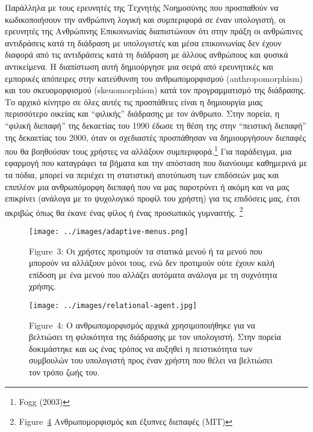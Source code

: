 \documentclass[
]{article}
\begin{document}
Παράλληλα με τους ερευνητές της Τεχνητής Νοημοσύνης που προσπαθούν να
κωδικοποιήσουν την ανθρώπινη λογική και συμπεριφορά σε έναν υπολογιστή,
οι ερευνητές της Ανθρώπινης Επικοινωνίας διαπιστώνουν ότι στην πράξη οι
ανθρώπινες αντιδράσεις κατά τη διάδραση με υπολογιστές και μέσα
επικοινωνίας δεν έχουν διαφορά από τις αντιδράσεις κατά τη διάδραση με
άλλους ανθρώπους και φυσικά αντικείμενα. Η διαπίστωση αυτή δημιούργησε
μια σειρά από ερευνητικές και εμπορικές απόπειρες στην κατεύθυνση του
ανθρωπομορφισμού (anthropomorphism) και του σκευομορφισμού
(skeuomorphism) κατά τον προγραμματισμό της διάδρασης. Το αρχικό κίνητρο
σε όλες αυτές τις προσπάθειες είναι η δημιουργία μιας περισσότερο
οικείας και ``φιλικής'' διάδρασης με τον άνθρωπο. Στην πορεία, η
``φιλική διεπαφή'' της δεκαετίας του 1990 έδωσε τη θέση της στην
``πειστική διεπαφή'' της δεκαετίας του 2000, όταν οι σχεδιαστές
προσπάθησαν να δημιουργήσουν διεπαφές που θα βοηθούσαν τους χρήστες να
αλλάξουν συμπεριφορά.\footnote{Fogg (2003)} Για παράδειγμα, μια εφαρμογή
που καταγράφει τα βήματα και την απόσταση που διανύουμε καθημερινά με τα
πόδια, μπορεί να περιέχει τη στατιστική αποτύπωση των επιδόσεών μας και
επιπλέον μια ανθρωπόμορφη διεπαφή που να μας παροτρύνει ή ακόμη και να
μας επικρίνει (ανάλογα με το ψυχολογικό προφίλ του χρήστη) για τις
επιδόσεις μας, έτσι ακριβώς όπως θα έκανε ένας φίλος ή ένας προσωπικός
γυμναστής. \footnote{Figure~\protect\hyperlink{fig:relational-agent}{4}
  Ανθρωπομορφισμός και έξυπνες διεπαφές (MIT)}

\leavevmode{}%
\begin{figure}
\hypertarget{fig:adaptive-menus}{%
\centering
\texttt{[image: ../images/adaptive-menus.png]}
\caption{Figure~3: Οι χρήστες προτιμούν τα στατικά μενού ή τα μενού που
μπορούν να αλλάξουν μόνοι τους, ενώ δεν προτιμούν ούτε έχουν καλή
επίδοση με ένα μενού που αλλάζει αυτόματα ανάλογα με τη συχνότητα
χρήσης.}\label{fig:adaptive-menus}
}
\end{figure}

\leavevmode{}%
\begin{figure}
\hypertarget{fig:relational-agent}{%
\centering
\texttt{[image: ../images/relational-agent.jpg]}
\caption{Figure~4: Ο ανθρωπομορφισμός αρχικά χρησιμοποιήθηκε για να
βελτιώσει τη φιλικότητα της διάδρασης με τον υπολογιστή. Στην πορεία
δοκιμάστηκε και ως ένας τρόπος να αυξηθεί η πειστικότητα των συμβουλών
του υπολογιστή προς έναν χρήστη που θέλει να βελτιώσει τον τρόπο ζωής
του.}\label{fig:relational-agent}
}
\end{figure}
\end{document}
